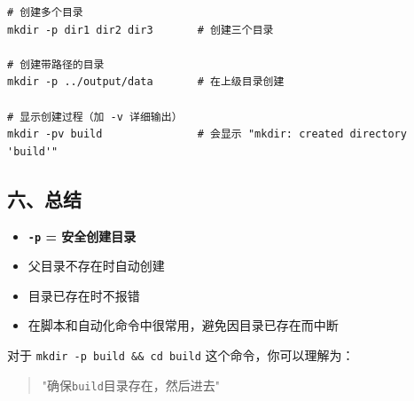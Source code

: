 \documentclass[11pt, a4paper]{article}
\begin{document}
\begin{aibox}
\begin{tcolorbox}[colback=white,colframe=gray!50!white,boxrule=0.5pt,arc=2pt,left=5pt,right=5pt,top=5pt,bottom=5pt]
\begin{verbatim}
# 创建多个目录
mkdir -p dir1 dir2 dir3       # 创建三个目录

# 创建带路径的目录
mkdir -p ../output/data       # 在上级目录创建

# 显示创建过程（加 -v 详细输出）
mkdir -pv build               # 会显示 "mkdir: created directory 'build'"
\end{verbatim}
\end{tcolorbox}

\subsection*{六、总结}

\begin{itemize}
    \item \textbf{\texttt{-p} = 安全创建目录}
    \item 父目录不存在时自动创建
    \item 目录已存在时不报错
    \item 在脚本和自动化命令中很常用，避免因目录已存在而中断
\end{itemize}

对于 \texttt{mkdir -p build \&\& cd build} 这个命令，你可以理解为：
\begin{quote}
"确保\texttt{build}目录存在，然后进去"
\end{quote}

\end{aibox}

\vspace{1.5em}
\end{document}
